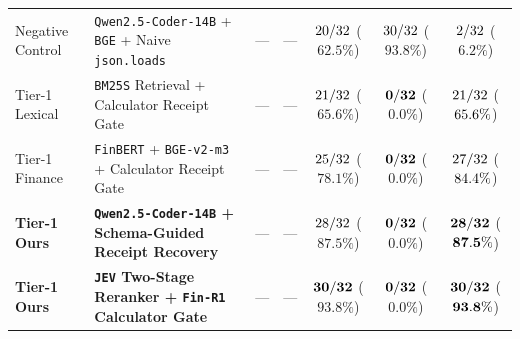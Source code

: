\begin{table}[t]
{\begin{tabular}{@{}llccccc@{}}
Negative Control & \texttt{Qwen2.5-Coder-14B} + \texttt{BGE} + Naive \texttt{json.loads} & --- & --- & $20/32$ ($62.5\%$) & $30/32$ ($93.8\%$) & $2/32$ ($6.2\%$) \\
Tier-1 Lexical & \texttt{BM25S} Retrieval + Calculator Receipt Gate & --- & --- & $21/32$ ($65.6\%$) & $\mathbf{0/32}$ ($\mathbf{0.0\%}$) & $21/32$ ($65.6\%$) \\
Tier-1 Finance & \texttt{FinBERT} + \texttt{BGE-v2-m3} + Calculator Receipt Gate & --- & --- & $25/32$ ($78.1\%$) & $\mathbf{0/32}$ ($\mathbf{0.0\%}$) & $27/32$ ($84.4\%$) \\
\textbf{Tier-1 Ours} & \textbf{\texttt{Qwen2.5-Coder-14B} + Schema-Guided Receipt Recovery} & --- & --- & $28/32$ ($87.5\%$) & $\mathbf{0/32}$ ($\mathbf{0.0\%}$) & $\mathbf{28/32}$ ($\mathbf{87.5\%}$) \\
\textbf{Tier-1 Ours} & \textbf{\texttt{JEV} Two-Stage Reranker + \texttt{Fin-R1} Calculator Gate} & --- & --- & $\mathbf{30/32}$ ($\mathbf{93.8\%}$) & $\mathbf{0/32}$ ($\mathbf{0.0\%}$) & $\mathbf{30/32}$ ($\mathbf{93.8\%}$) \\
\bottomrule
\end{tabular}%
}
\end{table}

